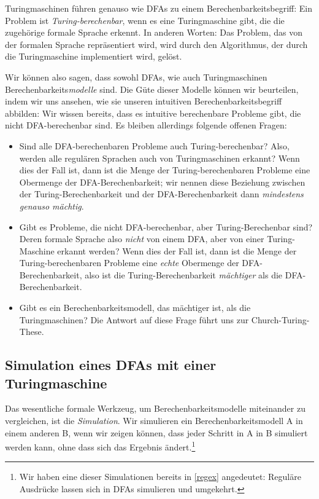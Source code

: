 Turingmaschinen führen genauso wie DFAs zu einem Berechenbarkeitsbegriff:
Ein Problem ist \emph{Turing-berechenbar},
wenn es eine Turingmaschine gibt,
die die zugehörige formale Sprache erkennt.
In anderen Worten:
Das Problem, das von der formalen Sprache repräsentiert wird,
wird durch den Algorithmus, der durch die Turingmaschine implementiert wird,
gelöst.

Wir können also sagen, dass sowohl DFAs, wie auch Turingmaschinen
Berechenbarkeits\emph{modelle} sind.
Die Güte dieser Modelle können wir beurteilen, 
indem wir uns ansehen, wie sie unseren intuitiven Berechenbarkeitsbegriff abbilden:
Wir wissen bereits, dass es intuitive berechenbare Probleme gibt,
die nicht DFA-berechenbar sind.
Es bleiben allerdings folgende offenen Fragen:

\begin{itemize}
    \item Sind alle DFA-berechenbaren Probleme auch Turing-berechenbar?
        Also, werden alle regulären Sprachen auch von Turingmaschinen erkannt?
        Wenn dies der Fall ist,
        dann ist die Menge der Turing-berechenbaren Probleme
        eine Obermenge der DFA-Berechenbarkeit;
        wir nennen diese Beziehung zwischen
        der Turing-Berechenbarkeit und der DFA-Berechenbarkeit
        dann \emph{mindestens genauso mächtig}.
    \item Gibt es Probleme, die nicht DFA-berechenbar, aber Turing-Berechenbar sind?
        Deren formale Sprache also \emph{nicht} von einem DFA,
        aber von einer Turing-Maschine erkannt werden?
        Wenn dies der Fall ist,
        dann ist die Menge der Turing-berechenbaren Probleme
        eine \emph{echte} Obermenge der DFA-Berechenbarkeit,
        also ist die Turing-Berechenbarkeit \emph{mächtiger} als die DFA-Berechenbarkeit.
    \item Gibt es ein Berechenbarkeitsmodell, das mächtiger ist, als die Turingmaschinen?
        Die Antwort auf diese Frage führt uns zur Church-Turing-These.
\end{itemize}

\subsection{Simulation eines DFAs mit einer Turingmaschine}

Das wesentliche formale Werkzeug,
um Berechenbarkeitsmodelle miteinander zu vergleichen,
ist die \emph{Simulation}.
Wir simulieren ein Berechenbarkeitsmodell A in einem anderen B,
wenn wir zeigen können, dass jeder Schritt in A in B simuliert werden kann,
ohne dass sich das Ergebnis ändert.\footnote{Wir haben eine dieser Simulationen bereits in \autoref{regex} angedeutet: Reguläre Ausdrücke lassen sich in DFAs simulieren und umgekehrt.}

